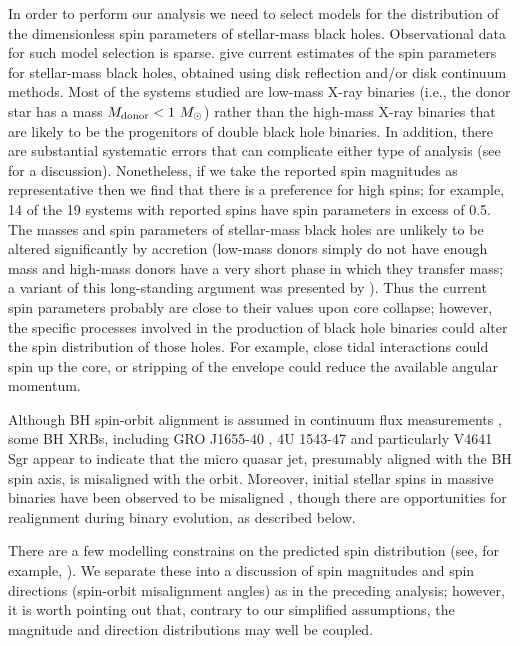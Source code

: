 \documentclass[modern,linenumbers]{aastex61}
\begin{document}
In order to perform our analysis we need to select models for the
distribution of the dimensionless spin parameters of stellar-mass
black holes.  Observational data for such model selection is sparse.
\citet{2015PhR...548....1M} give current estimates of the spin
parameters for stellar-mass black holes, obtained using disk
reflection and/or disk continuum methods.  Most of the systems studied
are low-mass X-ray binaries (i.e., the donor star has a mass
$M_{\rm donor}<1~M_\odot$) rather than the high-mass X-ray binaries
that are likely to be the progenitors of double black hole binaries.
In addition, there are substantial systematic errors that can
complicate either type of analysis (see \citealt{2015PhR...548....1M}
for a discussion). Nonetheless, if we take the reported spin
magnitudes as representative then we find that there is a preference
for high spins; for example, 14 of the 19 systems with reported spins
have spin parameters in excess of 0.5.  The masses and spin parameters
of stellar-mass black holes are unlikely to be altered significantly
by accretion (low-mass donors simply do not have enough mass and
high-mass donors have a very short phase in which they transfer mass;
a variant of this long-standing argument was presented by
\citet{1999MNRAS.305..654K}).  Thus the current spin parameters
probably are close to their values upon core collapse; however, the
specific processes involved in the production of black hole binaries
could alter the spin distribution of those holes.  For example, close
tidal interactions could spin up the core, or stripping of the
envelope could reduce the available angular momentum.

Although BH spin-orbit alignment is assumed in continuum flux
measurements \citep{2015PhR...548....1M}, some BH XRBs, including GRO
J1655-40 \citep{Martin:2008}, 4U 1543-47
\citep{MorningstarMiller:2014} and particularly V4641 Sgr
\citep{Orosz:2001,Martin:2008b} appear to indicate that the micro
quasar jet, presumably aligned with the BH spin axis, is misaligned
with the orbit.  Moreover, initial stellar spins in massive binaries
have been observed to be misaligned
\citep[e.g.,][]{Albrecht:2009,2014ApJ...785...83A}, though there are
opportunities for realignment during binary evolution, as described
below.

There are a few modelling constrains on the predicted spin
distribution (see, for example, \citep{2016ApJ...818L..22A}).  We
separate these into a discussion of spin magnitudes and spin
directions (spin-orbit misalignment angles) as in the preceding
analysis; however, it is worth pointing out that, contrary to our
simplified assumptions, the magnitude and direction distributions may
well be coupled.
\end{document}
